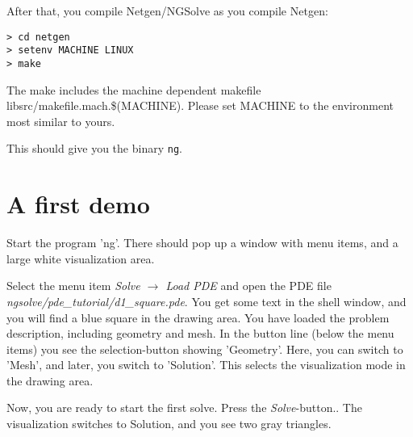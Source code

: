 \documentclass[12pt]{book}
\begin{document}
%
%
%
% 


After that, you compile Netgen/NGSolve as you compile
Netgen:

\begin{verbatim}
> cd netgen
> setenv MACHINE LINUX
> make
\end{verbatim}

The make includes the machine dependent makefile libsrc/makefile.mach.\$(MACHINE). 
Please set MACHINE to the environment most similar to yours.

\bigskip

This should give you the binary {\tt ng}. 

\section{A first demo}
Start the program 'ng'. There should pop up
a window with menu items, and a large white visualization area.

Select the menu item {\em Solve $\rightarrow$ Load PDE} and open the PDE file {\em ngsolve/pde\_tutorial/d1\_square.pde}. 
You get some text in the shell window, and you will find a blue square in the drawing area. 
You have loaded the problem description, including geometry and mesh. In the button line (below the menu items) you see the selection-button showing 'Geometry'. Here, you can switch to 'Mesh', and later, you switch to 'Solution'. 
This selects the visualization mode in the drawing area.


Now, you are ready to start the first solve. Press the {\em Solve}-button.. 
The visualization switches to Solution, and you see two gray triangles.
\end{document}

